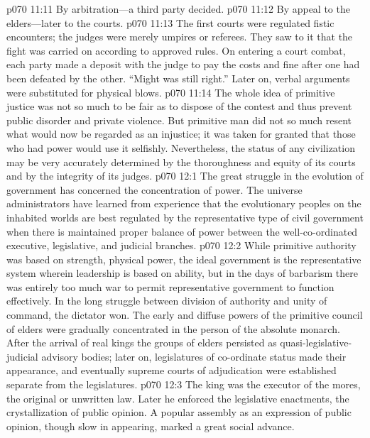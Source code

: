 \vs p070 11:11 \bibnobreakspace By arbitration---a third party decided.
\vs p070 11:12 \bibnobreakspace By appeal to the elders---later to the courts.
\pc \vs p070 11:13 The first courts were regulated fistic encounters; the judges were merely umpires or referees. They saw to it that the fight was carried on according to approved rules. On entering a court combat, each party made a deposit with the judge to pay the costs and fine after one had been defeated by the other. “Might was still right.” Later on, verbal arguments were substituted for physical blows.
\vs p070 11:14 The whole idea of primitive justice was not so much to be fair as to dispose of the contest and thus prevent public disorder and private violence. But primitive man did not so much resent what would now be regarded as an injustice; it was taken for granted that those who had power would use it selfishly. Nevertheless, the status of any civilization may be very accurately determined by the thoroughness and equity of its courts and by the integrity of its judges.
\vs p070 12:1 The great struggle in the evolution of government has concerned the concentration of power. The universe administrators have learned from experience that the evolutionary peoples on the inhabited worlds are best regulated by the representative type of civil government when there is maintained proper balance of power between the well\hyp{}co\hyp{}ordinated executive, legislative, and judicial branches.
\pc \vs p070 12:2 While primitive authority was based on strength, physical power, the ideal government is the representative system wherein leadership is based on ability, but in the days of barbarism there was entirely too much war to permit representative government to function effectively. In the long struggle between division of authority and unity of command, the dictator won. The early and diffuse powers of the primitive council of elders were gradually concentrated in the person of the absolute monarch. After the arrival of real kings the groups of elders persisted as quasi\hyp{}legislative\hyp{}judicial advisory bodies; later on, legislatures of co\hyp{}ordinate status made their appearance, and eventually supreme courts of adjudication were established separate from the legislatures.
\vs p070 12:3 The king was the executor of the mores, the original or unwritten law. Later he enforced the legislative enactments, the crystallization of public opinion. A popular assembly as an expression of public opinion, though slow in appearing, marked a great social advance.
